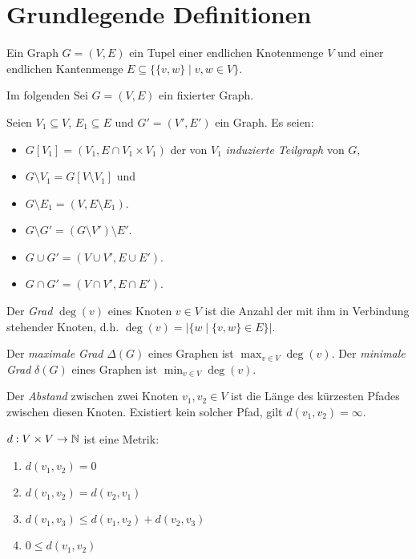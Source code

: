 \chapter{Grundlegende Definitionen}

\begin{definition}[Graph]
    Ein Graph $ G = (V, E) $ ein Tupel einer endlichen Knotenmenge $ V $ und einer endlichen Kantenmenge $ E \subseteq \{ \{ v, w \} \mid v, w \in V \} $.
\end{definition}

Im folgenden Sei $ G = (V, E) $ ein fixierter Graph.

\begin{definition}
    Seien $ V_1 \subseteq V $, $ E_1 \subseteq E $ und $ G' = (V', E') $ ein Graph.
    Es seien:
    \begin{itemize}
        \item $ G[V_1] = (V_1, E \cap V_1 \times V_1) $ der von $ V_1 $ \textit{induzierte Teilgraph} von $ G $,
        \item $ G \setminus V_1 = G[V \setminus V_1] $ und
        \item $ G \setminus E_1 = (V, E \setminus E_1) $.
        \item $ G \setminus G' = (G \setminus V') \setminus E' $.
        \item $ G \cup G' = (V \cup V', E \cup E') $.
        \item $ G \cap G' = (V \cap V', E \cap E') $.
    \end{itemize}
\end{definition}

\begin{definition}[Grad]
    Der \textit{Grad} $ \deg(v) $ eines Knoten $ v \in V $ ist die Anzahl der mit ihm in Verbindung stehender Knoten, d.h. $ \deg(v) = |\{ w \mid \{ v, w \} \in E \}| $.

    Der \textit{maximale Grad} $ \Delta(G) $ eines Graphen ist $ \max_{v \in V} \deg(v) $.
    Der \textit{minimale Grad} $ \delta(G) $ eines Graphen ist $ \min_{v \in V} \deg(v) $.
\end{definition}

\begin{definition}[Abstand]
    Der \textit{Abstand} zwischen zwei Knoten $ v_1, v_2 \in V $ ist die Länge des kürzesten Pfades zwischen diesen Knoten.
    Existiert kein solcher Pfad, gilt $ d(v_1, v_2) = \infty $.
\end{definition}

\begin{observation}
    $ d : V \times V \rightarrow \mathbb{N} $ ist eine Metrik:
    \begin{enumerate}
        \item $ d(v_1, v_2) = 0 $
        \item $ d(v_1, v_2) = d(v_2, v_1) $
        \item $ d(v_1, v_3) \leq d(v_1, v_2) + d(v_2, v_3) $
        \item $ 0 \leq d(v_1, v_2) $
    \end{enumerate}
\end{observation}

